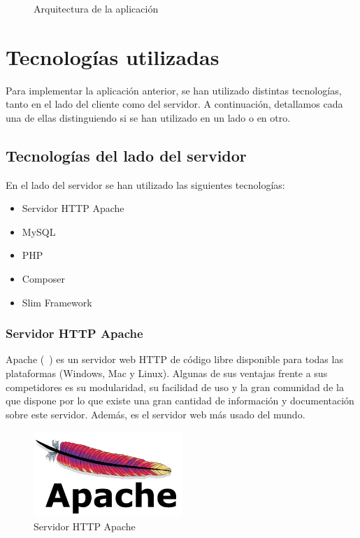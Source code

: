 \begin{figure}[htb]
\centering
\arquitectura
\caption{Arquitectura de la aplicación}
\label{fig:arquitectura}
\end{figure}

\section{Tecnologías utilizadas}

Para implementar la aplicación anterior, se han utilizado distintas tecnologías, tanto en el lado del cliente como del servidor. A continuación, detallamos cada una de ellas distinguiendo si se han utilizado en un lado o en otro.

\subsection{Tecnologías del lado del servidor}

En el lado del servidor se han utilizado las siguientes tecnologías:

\begin{itemize}
\item Servidor HTTP Apache
\item MySQL
\item PHP
\item Composer
\item Slim Framework
\end{itemize}

\subsubsection*{Servidor HTTP Apache}

Apache (~\cite{apache}) es un servidor web HTTP de código libre disponible para todas las plataformas (Windows, Mac y Linux). Algunas de sus ventajas frente a sus competidores es su modularidad, su facilidad de uso y la gran comunidad de la que dispone por lo que existe una gran cantidad de información y documentación sobre este servidor. Además, es el servidor web más usado del mundo.

\begin{figure}[tbh]
\centering
\label{fig:apache}
\includegraphics[width=0.5\textwidth]{imagenes/apache}
\caption{Servidor HTTP Apache}
\end{figure}

